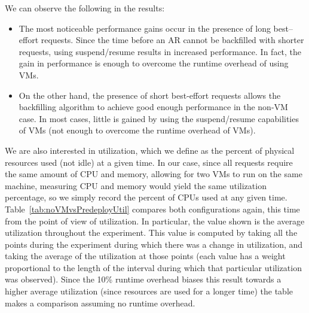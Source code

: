 We can observe the following in the results:
\begin{itemize}
\item The most noticeable performance gains occur in the presence of long best--effort requests. Since the time before an AR cannot be backfilled with shorter requests, using suspend/resume results in increased performance. In fact, the gain in performance is enough to overcome the runtime overhead of using VMs.
\item On the other hand, the presence of short best-effort requests allows the backfilling algorithm to achieve good enough performance in the non-VM case. In most cases, little is gained by using the suspend/resume capabilities of VMs (not enough to overcome the runtime overhead of VMs).
\end{itemize}

We are also interested in utilization, which we define as the percent of physical resources used (not idle) at a given time. In our case, since all requests require the same amount of CPU and memory, allowing for two VMs to run on the same machine, measuring CPU and memory would yield the same utilization percentage, so we simply record the percent of CPUs used at any given time. Table~\ref{tab:noVMvsPredeployUtil} compares both configurations again, this time from the point of view of utilization. In particular, the value shown is the average utilization throughout the experiment. This value is computed by taking all the points during the experiment during which there was a change in utilization, and taking the average of the utilization at those points (each value has a weight proportional to the length of the interval during which that particular utilization was observed). Since the 10\% runtime overhead biases this result towards a higher average utilization (since resources are used for a longer time) the table makes a comparison assuming no runtime overhead.

